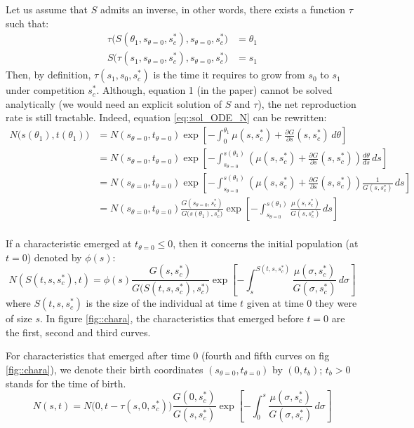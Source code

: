 \documentclass[letterpaper, 12pt]{article}
\newcommand {\s}{{s}^{*}}
\theoremstyle{theo}
\begin{document}
\begin{refsection}
\begin{onehalfspace}
Let us assume that $ S $ admits an inverse, in other words, there exists a function $ \tau $ such that:
\begin{align*}
	\tau \big( S(\theta_1, s_{\theta = 0}, \s_c), s_{\theta = 0}, \s_c \big) &= \theta_1 \\
	S \big(\tau(s_1, s_{\theta = 0}, \s_c), s_{\theta = 0}, \s_c \big) &= s_1
\end{align*}
Then, by definition, $ \tau(s_1, s_0, \s_c) $ is the time it requires to grow from $ s_0 $ to $ s_1 $ under competition $ \s_c $. Although, equation 1 (in the paper) cannot be solved analytically (we would need an explicit solution of $ S $ and $ \tau $), the net reproduction rate is still tractable. Indeed, equation \eqref{eq::sol_ODE_N} can be rewritten:
\begin{align*}
	N \big( s(\theta_1), t(\theta_1) \big) &= N( s_{\theta = 0}, t_{\theta = 0}) \exp \left[-\int_0^{\theta_1} \mu(s, \s_c) + \frac{\partial G}{\partial s}(s, \s_c) \, d\theta \right] \\
	&= N( s_{\theta = 0}, t_{\theta = 0}) \exp \left[-\int_{s_{\theta = 0}}^{s(\theta_1)} \left( \mu(s, \s_c) + \frac{\partial G}{\partial s}(s, \s_c) \right) \frac{d \theta}{ds} \, ds \right] \\
	&= N( s_{\theta = 0}, t_{\theta = 0}) \exp \left[-\int_{s_{\theta = 0}}^{s(\theta_1)} \left( \mu(s, \s_c) + \frac{\partial G}{\partial s}(s, \s_c) \right) \frac{1}{G(s, \s_c)} \, ds \right] \\
	&= N( s_{\theta = 0}, t_{\theta = 0}) \frac{G(s_{\theta = 0}, \s_c)}{G \big( s(\theta_1), \s_c \big)} \exp \left[-\int_{s_{\theta = 0}}^{s(\theta_1)} \frac{\mu(s, \s_c)}{G(s, \s_c)} \, ds \right] \\
\end{align*}

If a characteristic emerged at $ t_{\theta = 0} \leqslant 0 $, then it concerns the initial population (at $ t = 0 $) denoted by $ \phi(s) $:
\begin{equation}\label{eq::sol_init}
	N(S(t, s, \s_c), t) = \phi(s) \frac{G(s, \s_c)}{G\big( S(t, s, \s_c), \s_c \big)} \exp \left[ -\int_{s}^{S(t, s, \s_c)} \frac{\mu(\sigma, \s_c)}{G(\sigma, \s_c)} \, d\sigma \right]
\end{equation}
where $ S(t, s, \s_c) $ is the size of the individual at time $ t $ given at time $ 0 $ they were of size $ s $. In figure \ref{fig::chara}, the characteristics that emerged before $ t = 0 $ are the first, second and third curves.

For characteristics that emerged after time 0 (fourth and fifth curves on fig \ref{fig::chara}), we denote their birth coordinates $ (s_{\theta = 0}, t_{\theta = 0}) $ by $ (0, t_b) $; $ t_b > 0 $ stands for the time of birth.
\begin{equation}\label{eq::sol_later}
	N(s, t) = N \big( 0, t - \tau(s, 0, \s_c) \big) \frac{G(0, \s_c)}{G(s, \s_c)} \exp \left[ -\int_{0}^{s} \frac{\mu(\sigma, \s_c)}{G(\sigma, \s_c)} \, d\sigma \right]
\end{equation}


\end{onehalfspace}
\end{refsection}
\end{document}
